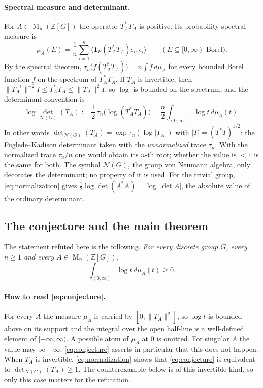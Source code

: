 \documentclass[11pt]{article}
\theoremstyle{remark}
\numberwithin{equation}{section}
\newcommand{\Z}{\mathbb Z}
\newcommand{\Mat}{\operatorname{M}}
\newcommand{\N}{\mathcal N}
\begin{document}
\paragraph{Spectral measure and determinant.}
For $A\in\Mat_n(\Z[G])$ the operator $T_A^*T_A$ is positive. Its probability spectral measure is
\[
 \mu_A(E)=\frac1n\sum_{i=1}^n\langle \mathbf1_E(T_A^*T_A)\epsilon_i,\epsilon_i\rangle
 \qquad(E\subseteq[0,\infty)\text{ Borel}).
\]
By the spectral theorem, $\tau_n\bigl(f(T_A^*T_A)\bigr)=n\int f\,d\mu_A$ for every bounded Borel function $f$ on the spectrum of $T_A^*T_A$. If $T_A$ is invertible, then $\|T_A^{-1}\|^{-2}I\le T_A^*T_A\le\|T_A\|^2I$, so $\log$ is bounded on the spectrum, and the determinant convention is
\begin{equation}\label{eq:normalization}
 \log\det_{\N(G)}(T_A)
 :=\frac12\,\tau_n\bigl(\log(T_A^*T_A)\bigr)
 =\frac n2\int_{(0,\infty)}\log t\,d\mu_A(t).
\end{equation}
In other words $\det_{\N(G)}(T_A)=\exp\tau_n(\log|T_A|)$ with $|T|=(T^*T)^{1/2}$: the Fuglede--Kadison determinant taken with the \emph{unnormalized} trace $\tau_n$. With the normalized trace $\tau_n/n$ one would obtain its $n$-th root; whether the value is $<1$ is the same for both. The symbol $\N(G)$, the group von Neumann algebra, only decorates the determinant; no property of it is used. For the trivial group, \eqref{eq:normalization} gives $\frac12\log\det(A^*A)=\log|\det A|$, the absolute value of the ordinary determinant.

\subsection{The conjecture and the main theorem}

The statement refuted here is the following. \emph{For every discrete group $G$, every $n\ge1$ and every $A\in\Mat_n(\Z[G])$,}
\begin{equation}\label{eq:conjecture}
 \int_{(0,\infty)}\log t\,d\mu_A(t)\ge0.
\end{equation}

\paragraph{How to read \eqref{eq:conjecture}.}
For every $A$ the measure $\mu_A$ is carried by $[0,\|T_A\|^2]$, so $\log t$ is bounded above on its support and the integral over the open half-line is a well-defined element of $[-\infty,\infty)$. A possible atom of $\mu_A$ at $0$ is omitted. For singular $A$ the value may be $-\infty$; \eqref{eq:conjecture} asserts in particular that this does not happen. When $T_A$ is invertible, \eqref{eq:normalization} shows that \eqref{eq:conjecture} is equivalent to $\det_{\N(G)}(T_A)\ge1$. The counterexample below is of this invertible kind, so only this case matters for the refutation.
\end{document}
